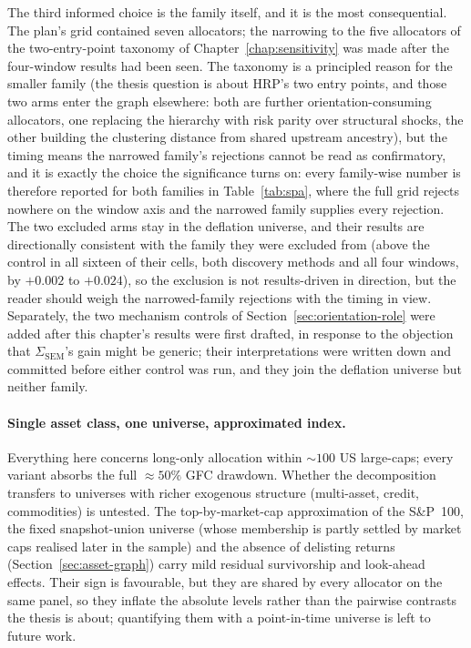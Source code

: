 The third informed choice is the family itself, and it is the most
consequential. The plan's grid contained seven allocators; the
narrowing to the five
allocators of the two-entry-point taxonomy of
Chapter~\ref{chap:sensitivity} was made after the four-window results
had been seen. The taxonomy is a principled reason for the smaller
family (the thesis question is about HRP's two entry points, and those
two arms enter the graph elsewhere: both are further
orientation-consuming allocators, one replacing the hierarchy with risk
parity over structural shocks, the other building the clustering
distance from shared upstream ancestry), but the timing means the narrowed
family's rejections cannot be read as
confirmatory, and it is exactly the choice
the significance turns on: every family-wise number is therefore
reported for both families in Table~\ref{tab:spa}, where the full grid
rejects nowhere on the window axis and the narrowed family supplies
every rejection. The two excluded arms stay in the deflation universe,
and their results are directionally consistent with the family they were
excluded from (above the control in all sixteen of their cells, both
discovery methods and all four windows, by $+0.002$ to $+0.024$), so
the exclusion is not results-driven in
direction, but the reader should weigh the narrowed-family rejections
with the timing in view. Separately, the two mechanism controls of
Section~\ref{sec:orientation-role} were added after this chapter's
results were first drafted, in response to the objection that
$\Sigma_{\mathrm{SEM}}$'s gain might be generic; their interpretations
were written down and committed before either control was run, and they
join the deflation universe but neither family.

\paragraph{Single asset class, one universe, approximated index.} Everything
here concerns long-only allocation within ${\sim}100$ US large-caps; every
variant absorbs the full ${\approx}50\%$ GFC drawdown. Whether the
decomposition transfers to universes with richer exogenous structure
(multi-asset, credit, commodities) is untested. The top-by-market-cap
approximation of the S\&P~100, the fixed snapshot-union universe (whose
membership is partly settled by market caps realised later in the
sample) and the absence of delisting returns
(Section~\ref{sec:asset-graph}) carry
mild residual survivorship and look-ahead effects. Their sign is
favourable, but they are shared by every allocator on the same panel, so
they inflate the absolute levels rather than the pairwise contrasts the
thesis is about; quantifying them with a point-in-time universe is left
to future work.

